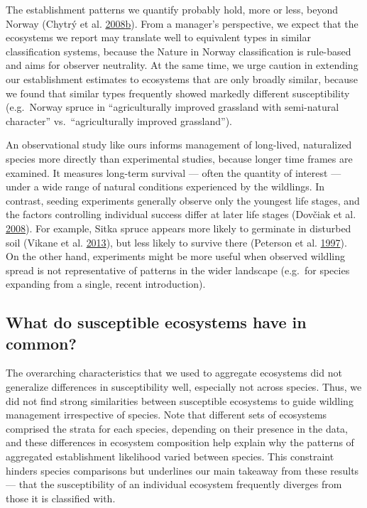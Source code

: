 \documentclass[
]{article}
\begin{document}
The establishment patterns we quantify probably hold, more or less, beyond Norway (Chytrý et al. \protect\hyperlink{ref-chytryHabitatInvasionsAlien2008}{2008}\protect\hyperlink{ref-chytryHabitatInvasionsAlien2008}{b}).
From a manager's perspective, we expect that the ecosystems we report may translate well to equivalent types in similar classification systems, because the Nature in Norway classification is rule-based and aims for observer neutrality.
At the same time, we urge caution in extending our establishment estimates to ecosystems that are only broadly similar, because we found that similar types frequently showed markedly different susceptibility (e.g.~Norway spruce in ``agriculturally improved grassland with semi-natural character'' vs.~``agriculturally improved grassland'').

An observational study like ours informs management of long-lived, naturalized species more directly than experimental studies, because longer time frames are examined.
It measures long-term survival --- often the quantity of interest --- under a wide range of natural conditions experienced by the wildlings.
In contrast, seeding experiments generally observe only the youngest life stages, and the factors controlling individual success differ at later life stages (Dovčiak et al. \protect\hyperlink{ref-dovciakSeedRainEnvironmental2008}{2008}).
For example, Sitka spruce appears more likely to germinate in disturbed soil (Vikane et al. \protect\hyperlink{ref-vikaneInvasionCallunaHeath2013}{2013}), but less likely to survive there (Peterson et al. \protect\hyperlink{ref-petersonEcologyManagementSitka1997}{1997}).
On the other hand, experiments might be more useful when observed wildling spread is not representative of patterns in the wider landscape (e.g.~for species expanding from a single, recent introduction).

\hypertarget{what-do-susceptible-ecosystems-have-in-common}{%
\subsection{What do susceptible ecosystems have in common?}\label{what-do-susceptible-ecosystems-have-in-common}}

The overarching characteristics that we used to aggregate ecosystems did not generalize differences in susceptibility well, especially not across species.
Thus, we did not find strong similarities between susceptible ecosystems to guide wildling management irrespective of species.
Note that different sets of ecosystems comprised the strata for each species, depending on their presence in the data, and these differences in ecosystem composition help explain why the patterns of aggregated establishment likelihood varied between species.
This constraint hinders species comparisons but underlines our main takeaway from these results --- that the susceptibility of an individual ecosystem frequently diverges from those it is classified with.
\end{document}
